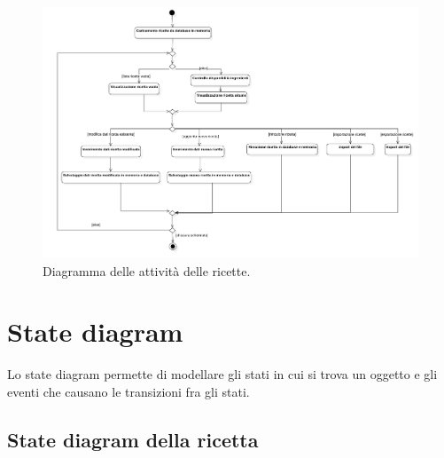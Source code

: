 \begin{figure}[H]
    \includegraphics[width=\linewidth]{images/activity-recipe.png}
    \caption{Diagramma delle attività delle ricette.}
    \label{fig:actrecipe}
\end{figure}

\newpage

\section{State diagram}

Lo state diagram permette di modellare gli stati in cui si trova un oggetto e gli eventi che causano le transizioni fra gli stati. 

\subsection{State diagram della ricetta}

